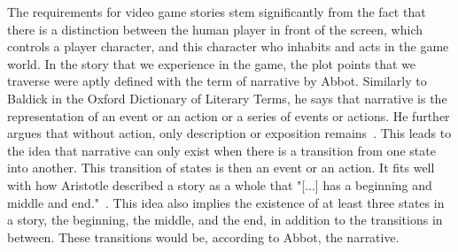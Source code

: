 The requirements for video game stories stem significantly from the fact that there is a distinction between the human player in front of the screen, which controls a player character, and this character who inhabits and acts in the game world. In the story that we experience in the game, the plot points that we traverse were aptly defined with the term of narrative by Abbot. Similarly to Baldick in the Oxford Dictionary of Literary Terms, he says that narrative is the representation of an event or an action or a series of events or actions. He further argues that without action, only description or exposition remains~\cite{Abbott2020}. This leads to the idea that narrative can only exist when there is a transition from one state into another. This transition of states is then an event or an action. It fits well with how Aristotle described a story as a whole that "[...] has a beginning and middle and end."~\cite{Aristotle2006}. This idea also implies the existence of at least three states in a story, the beginning, the middle, and the end, in addition to the transitions in between. These transitions would be, according to Abbot, the narrative.
